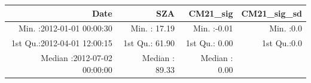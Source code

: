 \documentclass[
  10pt,
  a4paper,oneside]{article}
\begin{document}
\begin{longtable}[]{@{}rrrr@{}}
\toprule
\begin{minipage}[b]{0.34\columnwidth}\raggedleft
Date\strut
\end{minipage} & \begin{minipage}[b]{0.19\columnwidth}\raggedleft
SZA\strut
\end{minipage} & \begin{minipage}[b]{0.18\columnwidth}\raggedleft
CM21\_sig\strut
\end{minipage} & \begin{minipage}[b]{0.18\columnwidth}\raggedleft
CM21\_sig\_sd\strut
\end{minipage}\tabularnewline
\midrule
\endhead
\begin{minipage}[t]{0.34\columnwidth}\raggedleft
Min. :2012-01-01 00:00:30\strut
\end{minipage} & \begin{minipage}[t]{0.19\columnwidth}\raggedleft
Min. : 17.19\strut
\end{minipage} & \begin{minipage}[t]{0.18\columnwidth}\raggedleft
Min. :-0.01\strut
\end{minipage} & \begin{minipage}[t]{0.18\columnwidth}\raggedleft
Min. :0.0\strut
\end{minipage}\tabularnewline
\begin{minipage}[t]{0.34\columnwidth}\raggedleft
1st Qu.:2012-04-01 12:00:15\strut
\end{minipage} & \begin{minipage}[t]{0.19\columnwidth}\raggedleft
1st Qu.: 61.90\strut
\end{minipage} & \begin{minipage}[t]{0.18\columnwidth}\raggedleft
1st Qu.: 0.00\strut
\end{minipage} & \begin{minipage}[t]{0.18\columnwidth}\raggedleft
1st Qu.:0.0\strut
\end{minipage}\tabularnewline
\begin{minipage}[t]{0.34\columnwidth}\raggedleft
Median :2012-07-02 00:00:00\strut
\end{minipage} & \begin{minipage}[t]{0.19\columnwidth}\raggedleft
Median : 89.33\strut
\end{minipage} & \begin{minipage}[t]{0.18\columnwidth}\raggedleft
Median : 0.00\strut
\end{minipage} & \begin{minipage}[t]{0.18\columnwidth}\raggedleft

\end{minipage}
\end{longtable}
\end{document}
